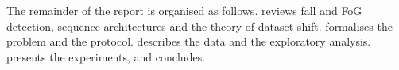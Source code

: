 The remainder of the report is organised as follows.  reviews fall and FoG
detection, sequence architectures and the theory of dataset shift.  formalises the
problem and the protocol.  describes the data and the exploratory analysis.
 presents the experiments, and  concludes.
